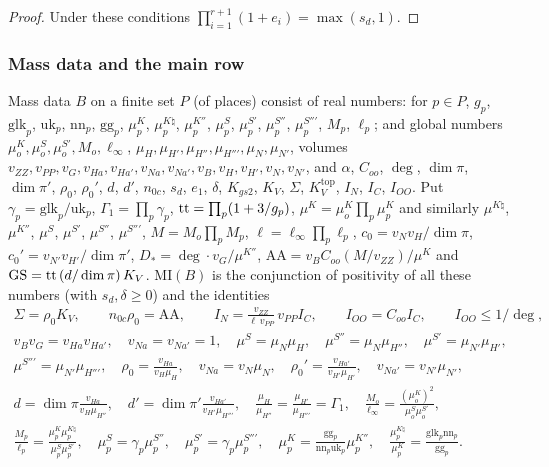 \begin{proof}
Under these conditions $\prod_{i=1}^{r+1}(1+e_i)=\max(s_d,1)$.
\end{proof}

\subsubsection{Mass data and the main row}\label{sec:pf:thmS:mass}

\begin{definition}\label{pf:thmS:massdata}
Mass data $B$ on a finite set $P$ (of places) consist of real numbers: for $p\in P$, $g_p$, $\mathrm{glk}_p$,
$\mathrm{uk}_p$, $\mathrm{nn}_p$, $\mathrm{gg}_p$, $\mu^K_p$, $\mu^{K\natural}_p$, $\mu^{K''}_p$, $\mu^S_p$, $\mu^{S'}_p$,
$\mu^{S''}_p$, $\mu^{S''\prime}_p$, $M_p$, $\ell_p$; and global numbers $\mu^K_o,\mu^S_o,\mu^{S'}_o,M_o,\ell_\infty$,
$\mu_H,\mu_{H'},\mu_{H''},\mu_{H''\prime},\mu_N,\mu_{N'}$, volumes $v_{ZZ},v_{PP},v_G,v_{Ha},v_{Ha'},v_{Na},v_{Na'},v_B,v_H,v_{H'},v_N,v_{N'}$,
and $\alpha$, $C_{oo}$, $\deg$, $\dim\pi$, $\dim\pi'$, $\rho_0$, $\rho_0'$, $d$, $d'$, $n_{0c}$, $s_d$, $e_1$, $\delta$, $K_{gs2}$,
$K_V$, $\Sigma$, $K^{\mathrm{top}}_V$, $I_N$, $I_C$, $I_{OO}$. Put $\gamma_p=\mathrm{glk}_p/\mathrm{uk}_p$,
$\Gamma_1=\prod_p\gamma_p$, $\mathrm{tt}=\prod_p(1+3/g_p)$, $\mu^K=\mu^K_o\prod_p\mu^K_p$ and similarly $\mu^{K\natural}$,
$\mu^{K''}$, $\mu^S$, $\mu^{S'}$, $\mu^{S''}$, $\mu^{S''\prime}$, $M=M_o\prod_pM_p$, $\ell=\ell_\infty\prod_p\ell_p$,
$c_0=v_Nv_H/\dim\pi$, $c_0'=v_{N'}v_{H'}/\dim\pi'$, $D_*=\deg\cdot v_G/\mu^{K''}$, $\mathrm{AA}=v_BC_{oo}(M/v_{ZZ})/\mu^K$ and
$\mathrm{GS}=\mathrm{tt}\,(d/\dim\pi)\,K_V$. $\mathrm{MI}(B)$ is the conjunction of positivity of all these numbers
(with $s_d,\delta\ge0$) and the identities
\begin{gather*}
\Sigma=\rho_0K_V,\qquad n_{0c}\rho_0=\mathrm{AA},\qquad I_N=\frac{v_{ZZ}}{\ell\,v_{PP}}\,v_{PP}I_C,\qquad I_{OO}=C_{oo}I_C,\qquad
I_{OO}\le1/\deg,\\
v_Bv_G=v_{Ha}v_{Ha'},\quad v_{Na}=v_{Na'}=1,\quad \mu^S=\mu_N\mu_H,\quad\mu^{S''}=\mu_N\mu_{H''},\quad\mu^{S'}=\mu_{N'}\mu_{H'},\\
\mu^{S''\prime}=\mu_{N'}\mu_{H''\prime},\quad
\rho_0=\frac{v_{Ha}}{v_H\mu_H},\quad v_{Na}=v_N\mu_N,\quad\rho_0'=\frac{v_{Ha'}}{v_{H'}\mu_{H'}},\quad v_{Na'}=v_{N'}\mu_{N'},\\
d=\dim\pi\frac{v_{Ha}}{v_H\mu_{H''}},\quad d'=\dim\pi'\frac{v_{Ha'}}{v_{H'}\mu_{H''\prime}},\quad\frac{\mu_H}{\mu_{H''}}=
\frac{\mu_{H'}}{\mu_{H''\prime}}=\Gamma_1,\quad
\frac{M_o}{\ell_\infty}=\frac{(\mu^K_o)^2}{\mu^S_o\mu^{S'}_o},\\
\frac{M_p}{\ell_p}=\frac{\mu^K_p\mu^{K\natural}_p}{\mu^S_p\mu^{S'}_p},\quad
\mu^S_p=\gamma_p\mu^{S''}_p,\quad\mu^{S'}_p=\gamma_p\mu^{S''\prime}_p,\quad\mu^K_p=\frac{\mathrm{gg}_p}{\mathrm{nn}_p\mathrm{uk}_p}\mu^{K''}_p,\quad
\frac{\mu^{K\natural}_p}{\mu^K_p}=\frac{\mathrm{glk}_p\mathrm{nn}_p}{\mathrm{gg}_p}.
\end{gather*}
\end{definition}

